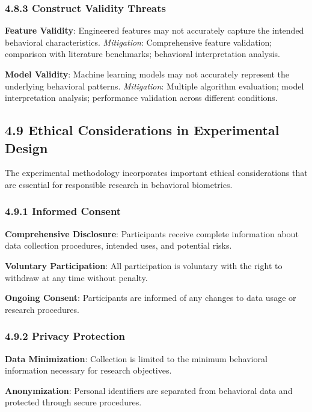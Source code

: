 \documentclass[
  11pt,
  a4paper,
]{article}
\begin{document}
\subsubsection{4.8.3 Construct Validity
Threats}\label{construct-validity-threats}

\textbf{Feature Validity}: Engineered features may not accurately
capture the intended behavioral characteristics. \emph{Mitigation}:
Comprehensive feature validation; comparison with literature benchmarks;
behavioral interpretation analysis.

\textbf{Model Validity}: Machine learning models may not accurately
represent the underlying behavioral patterns. \emph{Mitigation}:
Multiple algorithm evaluation; model interpretation analysis;
performance validation across different conditions.

\subsection{4.9 Ethical Considerations in Experimental
Design}\label{ethical-considerations-in-experimental-design}

The experimental methodology incorporates important ethical
considerations that are essential for responsible research in behavioral
biometrics.

\subsubsection{4.9.1 Informed Consent}\label{informed-consent}

\textbf{Comprehensive Disclosure}: Participants receive complete
information about data collection procedures, intended uses, and
potential risks.

\textbf{Voluntary Participation}: All participation is voluntary with
the right to withdraw at any time without penalty.

\textbf{Ongoing Consent}: Participants are informed of any changes to
data usage or research procedures.

\subsubsection{4.9.2 Privacy Protection}\label{privacy-protection}

\textbf{Data Minimization}: Collection is limited to the minimum
behavioral information necessary for research objectives.

\textbf{Anonymization}: Personal identifiers are separated from
behavioral data and protected through secure procedures.
\end{document}
